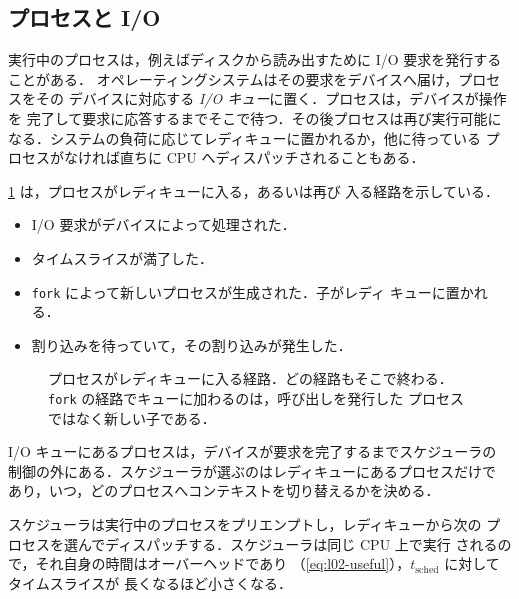 \documentclass[../main.tex]{subfiles}
\begin{document}
\subsection{プロセスと I/O}

実行中のプロセスは，例えばディスクから読み出すために I/O 要求を発行する
ことがある．%
オペレーティングシステムはその要求をデバイスへ届け，プロセスをその
デバイスに対応する \emph{I/O キュー}に置く．プロセスは，デバイスが操作を
完了して要求に応答するまでそこで待つ．その後プロセスは再び実行可能に
なる．システムの負荷に応じてレディキューに置かれるか，他に待っている
プロセスがなければ直ちに CPU へディスパッチされることもある．%

\cref{fig:l02-queues} は，プロセスがレディキューに入る，あるいは再び
入る経路を示している．
\begin{itemize}
  \item I/O 要求がデバイスによって処理された．
  \item タイムスライスが満了した．
  \item \texttt{fork} によって新しいプロセスが生成された．子がレディ
    キューに置かれる．
  \item 割り込みを待っていて，その割り込みが発生した．%
\end{itemize}

\begin{figure}[htbp]
  \centering
  
  \caption{プロセスがレディキューに入る経路．どの経路もそこで終わる．
    \texttt{fork} の経路でキューに加わるのは，呼び出しを発行した
    プロセスではなく新しい子である．}
  \label{fig:l02-queues}
\end{figure}

I/O キューにあるプロセスは，デバイスが要求を完了するまでスケジューラの
制御の外にある．スケジューラが選ぶのはレディキューにあるプロセスだけで
あり，いつ，どのプロセスへコンテキストを切り替えるかを決める．

\begin{keypoint}
  スケジューラは実行中のプロセスをプリエンプトし，レディキューから次の
  プロセスを選んでディスパッチする．スケジューラは同じ CPU 上で実行
  されるので，それ自身の時間はオーバーヘッドであり
  （\cref{eq:l02-useful}），$t_{\mathrm{sched}}$ に対してタイムスライスが
  長くなるほど小さくなる．
\end{keypoint}
\end{document}
